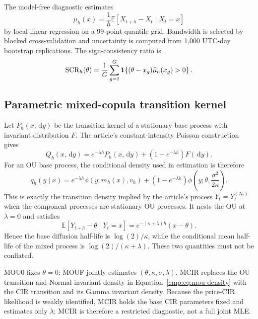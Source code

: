 \documentclass[11pt]{article}
\newcommand{\E}{\mathbb{E}}
\newcommand{\1}{\mathbf{1}}
\newcommand{\dd}{\,\mathrm{d}}
\begin{document}
The model-free diagnostic estimates
\begin{equation}
\mu_h(x)=\frac{1}{h}\E[X_{t+h}-X_t\mid X_t=x]
\label{emp:eq:finite-drift}
\end{equation}
by local-linear regression on a 99-point quantile grid.  Bandwidth is selected by
blocked cross-validation and uncertainty is computed from 1,000 UTC-day bootstrap
replications.  The sign-consistency ratio is
\begin{equation}
\operatorname{SCR}_h(\theta)
=\frac{1}{G}\sum_{g=1}^G
\mathbf 1\!\left\{(\theta-x_g)\widehat\mu_h(x_g)>0\right\}.
\label{emp:eq:scr}
\end{equation}

\subsection{Parametric mixed-copula transition kernel}

Let $P_h(x,\dd y)$ be the transition kernel of a stationary base process with
invariant distribution $F$.  The article's constant-intensity Poisson
construction gives
\begin{equation}
Q_h(x,\dd y)
=e^{-\lambda h}P_h(x,\dd y)
+\left(1-e^{-\lambda h}\right)F(\dd y).
\label{emp:eq:mixed-kernel}
\end{equation}
For an OU base process, the conditional density used in estimation is therefore
\begin{equation}
q_h(y\mid x)
=e^{-\lambda h}\phi\!\left(y;m_h(x),v_h\right)
+\left(1-e^{-\lambda h}\right)
\phi\!\left(y;\theta,\frac{\sigma^2}{2\kappa}\right).
\label{emp:eq:mou-density}
\end{equation}
This is exactly the transition density implied by the article's process
$Y_t=Y_t^{(N_t)}$ when the component processes are stationary OU processes.
It nests the OU at $\lambda=0$ and satisfies
\begin{equation}
\E[Y_{t+h}-\theta\mid Y_t=x]
=e^{-(\kappa+\lambda)h}(x-\theta).
\label{emp:eq:mou-mean}
\end{equation}
Hence the base diffusion half-life is $\log(2)/\kappa$, while the conditional
mean half-life of the mixed process is $\log(2)/(\kappa+\lambda)$.  These two
quantities must not be conflated.

MOU0 fixes $\theta=0$; MOUF jointly estimates
$(\theta,\kappa,\sigma,\lambda)$.  MCIR replaces the OU transition and Normal
invariant density in Equation~\eqref{emp:eq:mou-density} with the CIR transition
and its Gamma invariant density.  Because the price-CIR likelihood is weakly
identified, MCIR holds the base CIR parameters fixed and estimates only
$\lambda$; MCIR is therefore a restricted diagnostic, not a full joint MLE.
\end{document}
